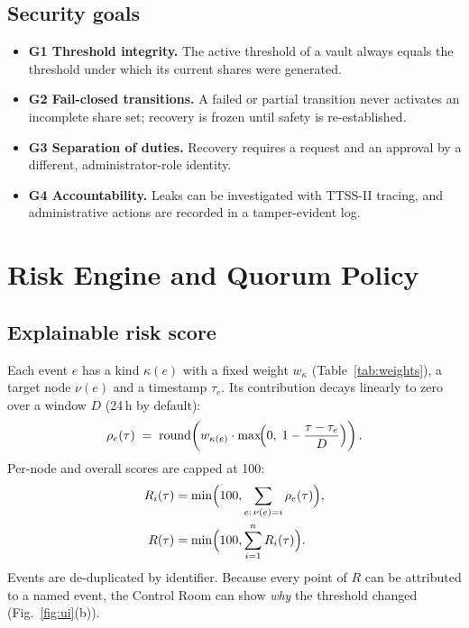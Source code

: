 \documentclass[conference]{IEEEtran}
\begin{document}
\subsection{Security goals}
\begin{itemize}
  \item \textbf{G1 Threshold integrity.} The active threshold of a vault always equals the threshold under which its current shares were generated.
  \item \textbf{G2 Fail-closed transitions.} A failed or partial transition never activates an incomplete share set; recovery is frozen until safety is re-established.
  \item \textbf{G3 Separation of duties.} Recovery requires a request and an approval by a different, administrator-role identity.
  \item \textbf{G4 Accountability.} Leaks can be investigated with TTSS-II tracing, and administrative actions are recorded in a tamper-evident log.
\end{itemize}

\section{Risk Engine and Quorum Policy}
\label{sec:risk}

\subsection{Explainable risk score}
Each event $e$ has a kind $\kappa(e)$ with a fixed weight $w_{\kappa}$ (Table~\ref{tab:weights}), a target node $\nu(e)$ and a timestamp $\tau_e$. Its contribution decays linearly to zero over a window $D$ (24\,h by default):
\begin{equation}
  \rho_e(\tau) \;=\; \operatorname{round}\!\left( w_{\kappa(e)} \cdot \max\!\Bigl(0,\; 1 - \frac{\tau-\tau_e}{D}\Bigr) \right).
  \label{eq:decay}
\end{equation}
Per-node and overall scores are capped at 100:
\begin{align}
  R_i(\tau) &= \min\Bigl(100, \sum_{e:\,\nu(e)=i} \rho_e(\tau)\Bigr), \nonumber\\
  R(\tau) &= \min\Bigl(100, \sum_{i=1}^{n} R_i(\tau)\Bigr).
  \label{eq:score}
\end{align}
Events are de-duplicated by identifier. Because every point of $R$ can be attributed to a named event, the Control Room can show \emph{why} the threshold changed (Fig.~\ref{fig:ui}(b)).
\end{document}
